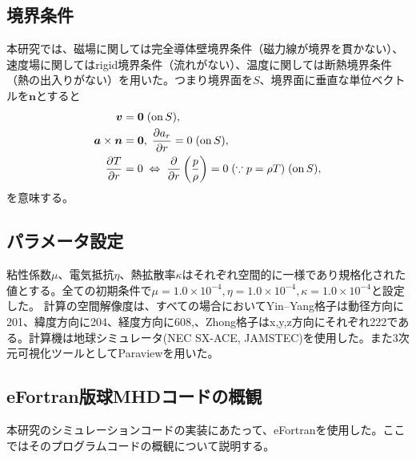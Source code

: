 \documentclass[12pt]{jsarticle}
\begin{document}
\subsection{境界条件}
本研究では、磁場に関しては完全導体壁境界条件（磁力線が境界を貫かない）、速度場に関してはrigid境界条件（流れがない）、温度に関しては断熱境界条件（熱の出入りがない）を用いた。つまり境界面を$S$、境界面に垂直な単位ベクトルを$\bm n$とすると
\begin{align}
\bm{v} &= \bm{0} \; ({\rm on}\, S), \\
\bm{a} \times \bm{n} &= \bm{0} , \; \frac{\partial a_r}{\partial r} = 0 \; ({\rm on}\, S), \\
\frac{\partial T}{\partial r} &= 0 \; \Leftrightarrow \; \frac{\partial}{\partial r}\left(\frac{p}{\rho}\right) = 0 \; (\because p=\rho T) \; ({\rm on}\, S),  
\end{align}
を意味する。

\subsection{パラメータ設定}
粘性係数$\mu$、電気抵抗$\eta$、熱拡散率$\kappa$はそれぞれ空間的に一様であり規格化された値とする。全ての初期条件で$\mu=1.0\times10^{-4},\eta=1.0\times10^{-4},\kappa=1.0\times10^{-4}$と設定した。
計算の空間解像度は、すべての場合においてYin--Yang格子は動径方向に201、緯度方向に204、経度方向に608,、Zhong格子はx,y,z方向にそれぞれ222である。計算機は地球シミュレータ(NEC SX-ACE, JAMSTEC)を使用した。また3次元可視化ツールとしてParaviewを用いた。

\subsection{eFortran版球MHDコードの概観}
本研究のシミュレーションコードの実装にあたって、eFortranを使用した。ここではそのプログラムコードの概観について説明する。


\end{document}
